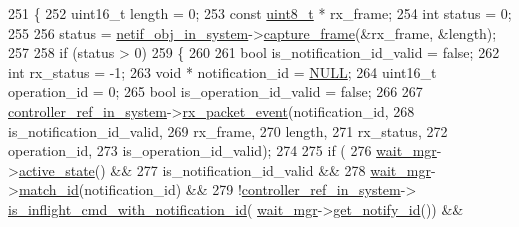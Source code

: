 \begin{DoxyCode}
251 \{
252     uint16\_t length = 0;
253     \textcolor{keyword}{const} \hyperlink{stdint_8h_aba7bc1797add20fe3efdf37ced1182c5}{uint8\_t} * rx\_frame;
254     \textcolor{keywordtype}{int} status = 0;
255 
256     status = \hyperlink{namespaceavdecc__lib_aa02659d86782158e7934e97da042e57a}{netif\_obj\_in\_system}->\hyperlink{classavdecc__lib_1_1net__interface__imp_a52700aecb2987cd1b864f50991089a9b}{capture\_frame}(&rx\_frame, &length);
257 
258     \textcolor{keywordflow}{if} (status > 0)
259     \{
260 
261         \textcolor{keywordtype}{bool} is\_notification\_id\_valid = \textcolor{keyword}{false};
262         \textcolor{keywordtype}{int} rx\_status = -1;
263         \textcolor{keywordtype}{void} * notification\_id = \hyperlink{openavb__types__base__pub_8h_a070d2ce7b6bb7e5c05602aa8c308d0c4}{NULL};
264         uint16\_t operation\_id = 0;
265         \textcolor{keywordtype}{bool} is\_operation\_id\_valid = \textcolor{keyword}{false};
266 
267         \hyperlink{namespaceavdecc__lib_a8f621b84ee2ae87ab9a54ca441e21f9b}{controller\_ref\_in\_system}->\hyperlink{classavdecc__lib_1_1controller__imp_abc210704762ea3b2cba8422543d3ce44}{rx\_packet\_event}(notification\_id,
268                                                   is\_notification\_id\_valid,
269                                                   rx\_frame,
270                                                   length,
271                                                   rx\_status,
272                                                   operation\_id,
273                                                   is\_operation\_id\_valid);
274 
275         \textcolor{keywordflow}{if} (
276             \hyperlink{classavdecc__lib_1_1system__layer2__multithreaded__callback_af8628baeb5f5db798721c4af01e8b253}{wait\_mgr}->\hyperlink{classavdecc__lib_1_1cmd__wait__mgr_a8abd7dc405798979dd738ccf88fff0bf}{active\_state}() &&
277             is\_notification\_id\_valid &&
278             \hyperlink{classavdecc__lib_1_1system__layer2__multithreaded__callback_af8628baeb5f5db798721c4af01e8b253}{wait\_mgr}->\hyperlink{classavdecc__lib_1_1cmd__wait__mgr_a4ab93b35c0976b309ed639f832c6643f}{match\_id}(notification\_id) &&
279             !\hyperlink{namespaceavdecc__lib_a8f621b84ee2ae87ab9a54ca441e21f9b}{controller\_ref\_in\_system}->
      \hyperlink{classavdecc__lib_1_1controller__imp_aa5c3cd6eac3ef43eb32c176106a182e6}{is\_inflight\_cmd\_with\_notification\_id}(
      \hyperlink{classavdecc__lib_1_1system__layer2__multithreaded__callback_af8628baeb5f5db798721c4af01e8b253}{wait\_mgr}->\hyperlink{classavdecc__lib_1_1cmd__wait__mgr_acae98c938b8473f03ddd1a430e30be1d}{get\_notify\_id}()) &&

\end{DoxyCode}
